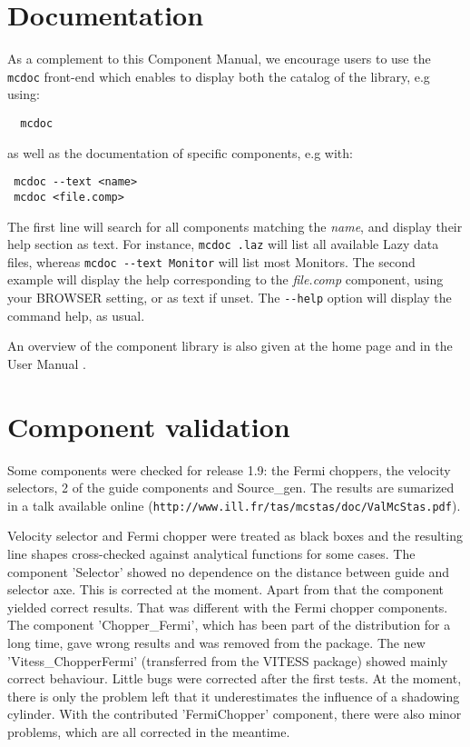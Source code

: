 \section{Documentation}
As a complement to this Component Manual, we encourage users to use
the \verb+mcdoc+ front-end which enables to display both the
catalog of the \MCS library, e.g using: 
\begin{lstlisting}
  mcdoc
\end{lstlisting}
as well as the documentation of specific components, e.g with:
\begin{lstlisting}
 mcdoc --text <name>
 mcdoc <file.comp>
\end{lstlisting}
The first line will search for all components matching the {\it name},
and display their help section as text. For instance, \verb+mcdoc .laz+ will list all available Lazy data files, whereas \verb+mcdoc --text Monitor+ will list most Monitors.
The second example will display the help corresponding to
the {\it file.comp} component, using your
BROWSER setting, or as text if unset.
The \verb+--help+ option will display the command help, as usual.

An overview of the component library is also given at the \MCS home page \cite{mcstas_webpage} and in the User Manual \cite{mcstasmanual}.

\section{Component validation}

Some components were checked for release 1.9: the Fermi choppers, the velocity selectors, 2 of the guide components and Source\_gen. The results are sumarized in a talk available online (\verb+http://www.ill.fr/tas/mcstas/doc/ValMcStas.pdf+).

Velocity selector and Fermi chopper were treated as black boxes and the resulting line shapes cross-checked against analytical functions for some cases.
The component 'Selector' showed no dependence on the distance between guide and selector axe. This is corrected at the moment. Apart from that the component yielded correct results.
That was different with the Fermi chopper components. The component 'Chopper\_Fermi', which has been part of the \MCS distribution for a long time, gave wrong results and was removed from the package. The new 'Vitess\_ChopperFermi' (transferred from the VITESS package) showed mainly correct behaviour. Little bugs were corrected after the first tests. At the moment, there is only the problem left that it underestimates the influence of a shadowing cylinder. With the contributed 'FermiChopper' component, there were also minor problems, which are all corrected in the meantime.

